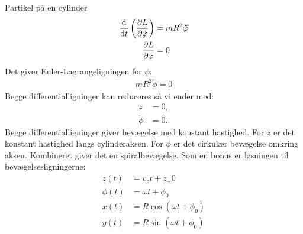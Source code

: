 \documentclass[crop=false, class=memoir]{standalone}
\begin{document}
\begin{opgave}[2]{Partikel på en cylinder}
\begin{align*}
	\dv{}{t}\left(\pdv{L}{\dot{\varphi}}\right) &= mR^2\ddot{\varphi}\\
	\pdv{L}{\varphi} &= 0
\end{align*}
%
Det giver Euler-Lagrangeligningen for $\phi$:
%
\begin{align}
	mR^2\ddot{\phi} = 0
\end{align}
%
Begge differentialligninger kan reduceres så vi ender med:
%
\begin{align*}
	\ddot{z} &= 0,\\
	\ddot{\phi} &= 0.
\end{align*}
%
\opg Begge differentialligninger giver bevægelse med konstant hastighed. For $z$ er det konstant hastighed langs cylinderaksen. For $\phi$ er det cirkulær bevægelse omkring aksen. Kombineret giver det en spiralbevægelse. Som en bonus er løsningen til bevægelsesligningerne:
%
\begin{align*}
	z(t) &= v_z t+z_+0 \\
	\phi(t) &= \omega t + \phi_0 \\
	x(t) &= R\cos(\omega t+\phi_0) \\
	y(t) &= R\sin(\omega t + \phi_0)
\end{align*}
%
\end{opgave}
\end{document}
